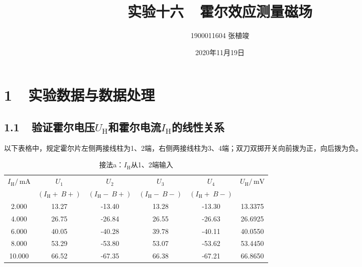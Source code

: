 \documentclass[a4paper,fontset=windows]{ctexart}
\begin{document}
\Large

    \title{\huge\textbf{实验十六\ \ 霍尔效应测量磁场}}
    \author{\LARGE 1900011604 张植竣}
    \date{\LARGE 2020年11月19日}

    \maketitle

    \section*{1\ \  实验数据与数据处理}
    \bigskip

    \subsection*{1.1\ \ 验证霍尔电压$U_\mathrm{H}$和霍尔电流$I_\mathrm{H}$的线性关系}

    以下表格中，规定霍尔片左侧两接线柱为1、2端，右侧两接线柱为3、4端；双刀双掷开关向前拨为正，向后拨为负。

    \vspace{0.5em}
    \begin{table}[ht!]\large
        \begin{center}
        \caption*{\large 接法a：$I_\mathrm{H}$从1、2端输入}
            \begin{tabular}{ |c|c|c|c|c|c| }
                \hline
                \multirow{2}{*}{$I_\mathrm{H}/\,\mathrm{mA}$} & $U_1$ & $U_2$ & $U_3$ & $U_4$ & \multirow{2}{*}{$U_\mathrm{H}/\,\mathrm{mV}$} \\
                & $(I_\mathrm{H}+\ B+)$ & $(I_\mathrm{H}-\ B+)$ & $(I_\mathrm{H}-\ B-)$ & $(I_\mathrm{H}+\ B-)$ & \\
                \hline
                2.000 & 13.27 & -13.40 & 13.28 & -13.30 & 13.3375 \\
                \hline
                4.000 & 26.75 & -26.84 & 26.55 & -26.63 & 26.6925 \\
                \hline
                6.000 & 40.05 & -40.28 & 39.78 & -40.11 & 40.0550 \\
                \hline
                8.000 & 53.29 & -53.80 & 53.07 & -53.62 & 53.4450 \\
                \hline
                10.000 & 66.52 & -67.35 & 66.38 & -67.21 & 66.8650 \\
                \hline
            \end{tabular}
        \end{center}
    \end{table}
    \vspace{-0.5em}
\end{document}
